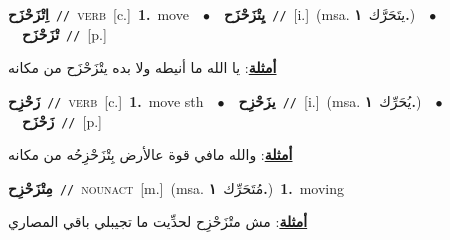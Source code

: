 \documentclass[10pt,a4paper,twoside]{article} %
\begin{document}
\begin{multicols}{2}
{{{{{{{{\setlength\topsep{0pt}\textbf{\foreignlanguage{arabic}{اِتْزَحْزَح}}\ {\color{gray}\texttt{//}\color{black}}\ \textsc{verb}\ [c.]\ \textbf{1.}~move\ \ $\bullet$\ \ \setlength\topsep{0pt}\textbf{\foreignlanguage{arabic}{يِتْزَحْزَح}}\ {\color{gray}\texttt{//}\color{black}}\ [i.]\ \color{gray}(msa. \foreignlanguage{arabic}{يتَحَرَّك}~\foreignlanguage{arabic}{\textbf{١.}})\color{black}\ \ $\bullet$\ \ \setlength\topsep{0pt}\textbf{\foreignlanguage{arabic}{تْزَحْزَح}}\ {\color{gray}\texttt{//}\color{black}}\ [p.]\  \begin{flushright}\color{gray}\foreignlanguage{arabic}{\textbf{\underline{\foreignlanguage{arabic}{أمثلة}}}: يا الله ما أنيطه ولا بده يتْزَحْزَح من مكانه}\end{flushright}\color{black}} \vspace{2mm}

{\setlength\topsep{0pt}\textbf{\foreignlanguage{arabic}{زَحْزِح}}\ {\color{gray}\texttt{//}\color{black}}\ \textsc{verb}\ [c.]\ \textbf{1.}~move sth\ \ $\bullet$\ \ \setlength\topsep{0pt}\textbf{\foreignlanguage{arabic}{يزَحْزِح}}\ {\color{gray}\texttt{//}\color{black}}\ [i.]\ \color{gray}(msa. \foreignlanguage{arabic}{يُحَرِّك}~\foreignlanguage{arabic}{\textbf{١.}})\color{black}\ \ $\bullet$\ \ \setlength\topsep{0pt}\textbf{\foreignlanguage{arabic}{زَحْزَح}}\ {\color{gray}\texttt{//}\color{black}}\ [p.]\  \begin{flushright}\color{gray}\foreignlanguage{arabic}{\textbf{\underline{\foreignlanguage{arabic}{أمثلة}}}: والله مافي قوة عالأرض بِتْزَحْزِحُه من مكانه}\end{flushright}\color{black}} \vspace{2mm}

{\setlength\topsep{0pt}\textbf{\foreignlanguage{arabic}{مِتْزَحْزِح}}\ {\color{gray}\texttt{//}\color{black}}\ \textsc{noun\textunderscore act}\ [m.]\ \color{gray}(msa. \foreignlanguage{arabic}{مُتَحَرِّك}~\foreignlanguage{arabic}{\textbf{١.}})\color{black}\ \textbf{1.}~moving\  \begin{flushright}\color{gray}\foreignlanguage{arabic}{\textbf{\underline{\foreignlanguage{arabic}{أمثلة}}}: مش متْزَحْزِح لحدِّيت ما تجيبلي باقي المصاري}\end{flushright}\color{black}} \vspace{2mm}

}}}}}}}
\end{multicols}
\end{document}
